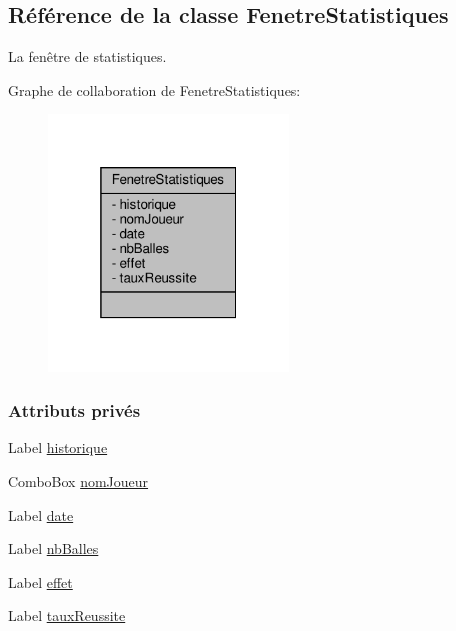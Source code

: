 \hypertarget{class_fenetre_statistiques}{}\subsection{Référence de la classe Fenetre\+Statistiques}
\label{class_fenetre_statistiques}


La fenêtre de statistiques.  




Graphe de collaboration de Fenetre\+Statistiques\+:\nopagebreak
\begin{figure}[H]
\begin{center}
\leavevmode
\includegraphics[width=181pt]{class_fenetre_statistiques__coll__graph}
\end{center}
\end{figure}
\subsubsection*{Attributs privés}
\begin{DoxyCompactItemize}
\item 
Label \hyperlink{class_fenetre_statistiques_a7548946406b0e02e77afe22186c5cf60}{historique}
\item 
Combo\+Box \hyperlink{class_fenetre_statistiques_ae9e7fdd597da5eec37f778e8112c9e9d}{nom\+Joueur}
\item 
Label \hyperlink{class_fenetre_statistiques_a20efcc33e8d734cb03be75707090657f}{date}
\item 
Label \hyperlink{class_fenetre_statistiques_aad6e87bf6ef3f93c1e822a89ee3ef670}{nb\+Balles}
\item 
Label \hyperlink{class_fenetre_statistiques_a5de87dc998601fe28e7ad8241f5ecf15}{effet}
\item 
Label \hyperlink{class_fenetre_statistiques_a7e8c37734686155a9ff4f5df86b418ec}{taux\+Reussite}
\end{DoxyCompactItemize}


